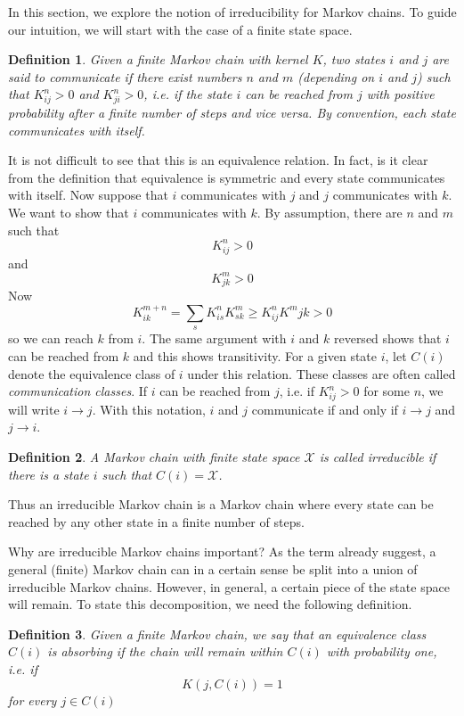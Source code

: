 \documentclass[a4paper, draft]{article}
\theoremstyle{own}
\newtheorem{defn}{Definition}[section]
\theoremstyle{remark}
\begin{document}
In this section, we explore the notion of irreducibility for Markov chains. To guide our intuition, we will start with the case of a finite state space.

\begin{defn}
	Given a finite Markov chain with kernel $K$, two states $i$ and $j$ are said to {\em communicate} if there exist numbers $n$ and $m$ (depending on $i$ and $j$) such that $K^n_{ij} > 0$ and $K^n_{ji} > 0$, i.e. if the state $i$ can be reached from $j$ with positive probability after a finite number of steps and vice versa. By convention, each state communicates with itself. 
\end{defn}

It is not difficult to see that this is an equivalence relation. In fact, is it clear from the definition that equivalence is symmetric and every state communicates with itself. Now suppose that $i$ communicates with $j$ and $j$ communicates with $k$. We want to show that $i$ communicates with $k$. By assumption, there are $n$ and $m$ such that 
$$
K^n_{ij} > 0
$$
and
$$
K^m_{jk} >0
$$
Now
$$
K^{m+n}_{ik} = \sum_s K^n_{is} K^m_{sk} \geq K^n_{ij} K^m{jk} > 0
$$
so we can reach $k$ from $i$. The same argument with $i$ and $k$ reversed shows that $i$ can be reached from $k$ and this shows transitivity. For a given state $i$, let $C(i)$ denote the equivalence class of $i$ under this relation. These classes are often called {\em communication classes}. If $i$ can be reached from $j$, i.e. if $K^n_{ij} > 0$ for some $n$, we will write $i \rightarrow j$. With this notation, $i$ and $j$ communicate if and only if $i \rightarrow j$ and $j \rightarrow i$.

\begin{defn}
	A Markov chain with finite state space ${\mathcal X}$ is called {\em irreducible} if there is a state $i$ such that $C(i) = {\mathcal X}$. 
\end{defn}

Thus an irreducible Markov chain is a Markov chain where every state can be reached by any other state in a finite number of steps.  

Why are irreducible Markov chains important? As the term already suggest, a general (finite) Markov chain can in a certain sense be split into a union of irreducible Markov chains. However, in general, a certain piece of the state space will remain. To state this decomposition, we need the following definition.

\begin{defn}
	Given a finite Markov chain, we say that an equivalence class $C(i)$ is {\em absorbing} if the chain will remain within $C(i)$ with probability one, i.e. if
	$$
	K(j,C(i)) = 1
	$$
	for every $j \in C(i)$
\end{defn}
\end{document}
